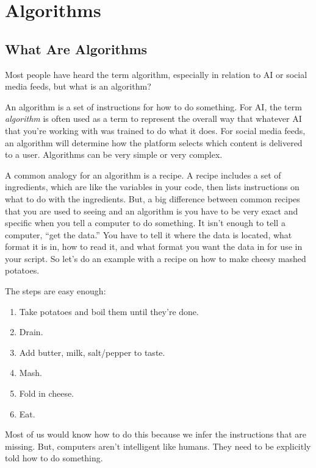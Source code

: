 \documentclass[
]{book}
\providecommand{\tightlist}{%
  \setlength{\itemsep}{0pt}\setlength{\parskip}{0pt}}
\begin{document}
\chapter{Algorithms}\label{algorithms}

\section{What Are Algorithms}\label{what-are-algorithms}

Most people have heard the term algorithm, especially in relation to AI or social media feeds, but what is an algorithm?

An algorithm is a set of instructions for how to do something. For AI, the term \emph{algorithm} is often used as a term to represent the overall way that whatever AI that you're working with was trained to do what it does. For social media feeds, an algorithm will determine how the platform selects which content is delivered to a user. Algorithms can be very simple or very complex.

A common analogy for an algorithm is a recipe. A recipe includes a set of ingredients, which are like the variables in your code, then lists instructions on what to do with the ingredients. But, a big difference between common recipes that you are used to seeing and an algorithm is you have to be very exact and specific when you tell a computer to do something. It isn't enough to tell a computer, ``get the data.'' You have to tell it where the data is located, what format it is in, how to read it, and what format you want the data in for use in your script. So let's do an example with a recipe on how to make cheesy mashed potatoes.

The steps are easy enough:

\begin{enumerate}
\def\labelenumi{\arabic{enumi}.}
\tightlist
\item
  Take potatoes and boil them until they're done.
\item
  Drain.
\item
  Add butter, milk, salt/pepper to taste.
\item
  Mash.
\item
  Fold in cheese.
\item
  Eat.
\end{enumerate}

Most of us would know how to do this because we infer the instructions that are missing. But, computers aren't intelligent like humans. They need to be explicitly told how to do something.
\end{document}
